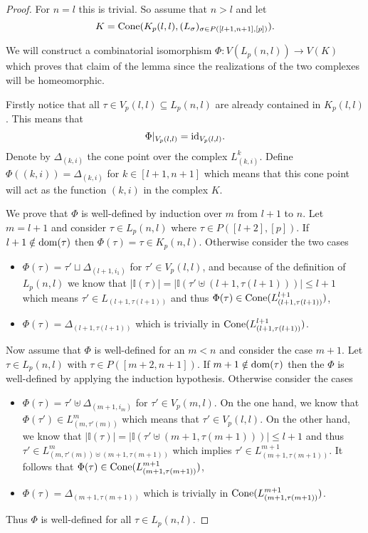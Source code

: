 \begin{proof}
  For $n = l$ this is trivial. So assume that $n > l$ and let \[K = {\rm Cone}(K_p(l,l), (L_\sigma)_{\sigma \in P([l+1,n+1],[p])}).\]
  
  We will construct a combinatorial isomorphism $\Phi\colon V(L_p(n,l)) \to V(K)$ which proves that claim of the lemma since the realizations of the two complexes will be homeomorphic.
  
  Firstly notice that all $\tau \in V_p(l,l) \subseteq L_p(n,l)$ are already contained in $K_p(l,l)$. This means that \[\Phi|_{V_p(l,l)} = {\rm id}_{V_p(l,l)}.\] 
  Denote by $\Delta_{(k,i)}$ the cone point over the complex $L^k_{(k,i)}$. Define $\Phi((k,i)) = \Delta_{(k,i)}$ for $k \in [l+1,n+1]$ which means that this cone point will act as the function $(k,i)$ in the complex $K$.

  We prove that $\Phi$ is well-defined by induction over $m$ from $l+1$ to $n$. Let $m = l+1$ and consider $\tau \in L_p(n,l)$ where $\tau \in P([l+2],[p])$. If $l+1 \notin {\rm dom}(\tau)$ then $\Phi(\tau) = \tau \in K_p(n,l)$. Otherwise consider the two cases
  \begin{itemize}
    \item $\Phi(\tau) = \tau' \sqcup \Delta_{(l+1, i_1)}$ for $\tau' \in V_p(l,l)$, and because of the definition of $L_p(n,l)$ we know that $|\mathbb{I}(\tau)| = |\mathbb{I}(\tau' \uplus (l+1,\tau(l+1)))| \leq l+1$ which means $\tau' \in L_{(l+1,\tau(l+1))}$ and thus $\Phi(\tau) \in {\rm Cone}(L^{l+1}_{(l+1,\tau(l+1))})$,
    \item $\Phi(\tau) = \Delta_{(l+1,\tau(l+1))}$ which is trivially in ${\rm Cone}(L^{l+1}_{(l+1,\tau(l+1))})$.
    \end{itemize}
    Now assume that $\Phi$ is well-defined for an $m < n$ and consider the case $m+1$. Let $\tau \in L_p(n,l)$ with $\tau \in P([m+2, n+1])$. If $m+1 \notin {\rm dom}(\tau)$ then the $\Phi$ is well-defined by applying the induction hypothesis. Otherwise consider the cases
    \begin{itemize}
      \item $\Phi(\tau) = \tau' \uplus \Delta_{(m+1,i_m)}$ for $\tau' \in V_p(m,l)$. On the one hand, we know that $\Phi(\tau') \in L^m_{(m,\tau'(m))}$ which means that $\tau'\in V_p(l,l)$. On the other hand, we know that $|\mathbb{I}(\tau)| = |\mathbb{I}(\tau'\uplus (m+1,\tau(m+1)))| \leq l+1$ and thus $\tau' \in L^m_{(m,\tau'(m))\uplus(m+1, \tau(m+1))}$ which implies $\tau' \in L^{m+1}_{(m+1,\tau(m+1))}$. It follows that $\Phi(\tau) \in {\rm Cone}(L^{m+1}_{(m+1,\tau(m+1))})$,
      \item $\Phi(\tau) = \Delta_{(m+1,\tau(m+1))}$ which is trivially in ${\rm Cone}(L^{m+1}_{(m+1,\tau(m+1))})$.
    \end{itemize}
    Thus $\Phi$ is well-defined for all $\tau \in L_p(n,l)$.


\end{proof}
